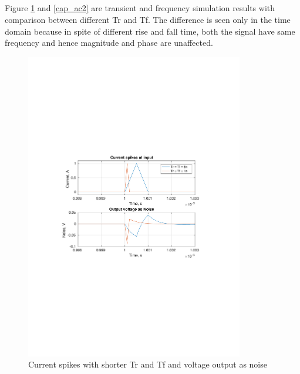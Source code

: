 \documentclass[12pt,a4paper,UKenglish]{article}
\begin{document}
\subsection{}
Figure  \ref{cap_tran2} and  \ref{cap_ac2}  are transient and frequency simulation results with comparison between different Tr and Tf. The difference is seen only in the time domain because in spite of different rise and fall time, both the signal have same frequency and hence magnitude and phase are unaffected. 
\begin{figure} [H]
  \centering 
  \includegraphics[width=0.85\textwidth]{img/3f_tran.pdf} 
  \caption{Current spikes with shorter Tr and Tf and voltage output as noise}
  \label{cap_tran2} 
\end{figure}
\end{document}

